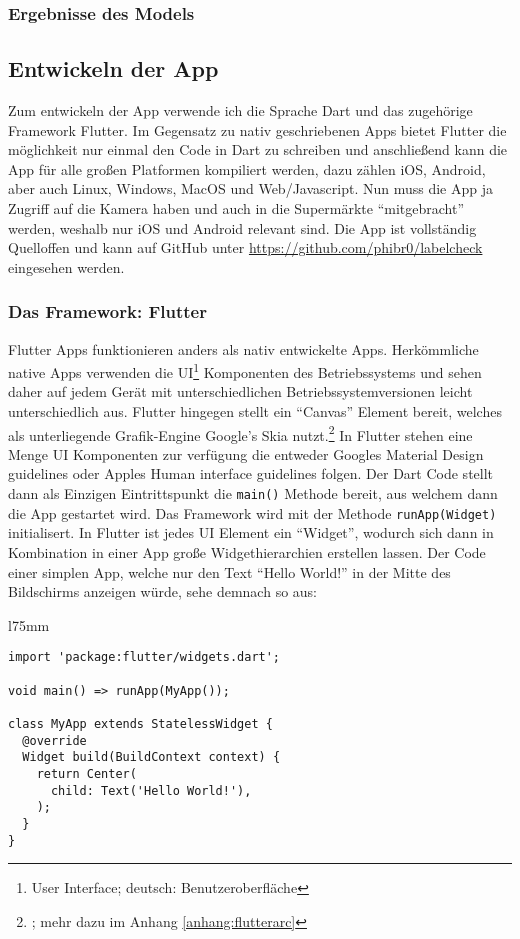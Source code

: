 \subsubsection{Ergebnisse des Models}

\subsection{Entwickeln der App}

Zum entwickeln der App verwende ich die Sprache Dart und das zugehörige Framework Flutter. Im Gegensatz zu nativ geschriebenen Apps bietet Flutter die möglichkeit nur einmal den Code in Dart zu schreiben und anschließend kann die App für alle großen Platformen kompiliert werden, dazu zählen iOS, Android, aber auch Linux, Windows, MacOS und Web/Javascript. Nun muss die App ja Zugriff auf die Kamera haben und auch in die Supermärkte "`mitgebracht"' werden, weshalb nur iOS und Android relevant sind. Die App ist vollständig Quelloffen und kann auf GitHub unter \url{https://github.com/phibr0/labelcheck} eingesehen werden.

\subsubsection{Das Framework: Flutter}

Flutter Apps funktionieren anders als nativ entwickelte Apps. Herkömmliche native Apps verwenden die UI\footnote{User Interface; deutsch: Benutzeroberfläche} Komponenten des Betriebssystems und sehen daher auf jedem Gerät mit unterschiedlichen Betriebssystemversionen leicht unterschiedlich aus. Flutter hingegen stellt ein "`Canvas"' Element bereit, welches als unterliegende Grafik-Engine Google's Skia nutzt.\footnote{\cite{flutterarchitecture}; mehr dazu im Anhang \ref{anhang:flutterarc}} In Flutter stehen eine Menge UI Komponenten zur verfügung die entweder Googles Material Design guidelines oder Apples Human interface guidelines folgen. Der Dart Code stellt dann als Einzigen Eintrittspunkt die \texttt{main()} Methode bereit, aus welchem dann die App gestartet wird. Das Framework wird mit der Methode \texttt{runApp(Widget)} initialisert. In Flutter ist jedes UI Element ein "`Widget"', wodurch sich dann in Kombination in einer App große Widgethierarchien erstellen lassen. Der Code einer simplen App, welche nur den Text "`Hello World!"' in der Mitte des Bildschirms anzeigen würde, sehe demnach so aus:

\begin{wrapfigure}{l}{75mm}
  \begin{verbatim}
import 'package:flutter/widgets.dart';

void main() => runApp(MyApp());

class MyApp extends StatelessWidget {
  @override
  Widget build(BuildContext context) {
    return Center(
      child: Text('Hello World!'),
    );
  }
}
\end{verbatim}
\end{wrapfigure}

